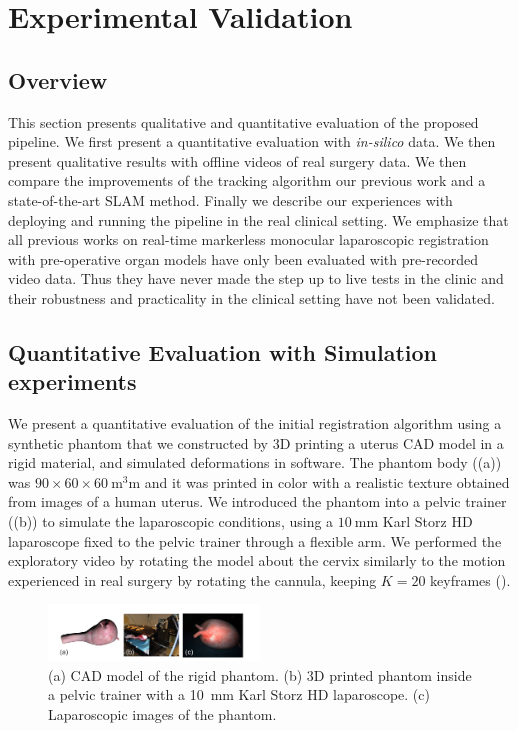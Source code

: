 
\section{Experimental Validation}
\label{sec:experiments}
\subsection{Overview}
This section presents qualitative and quantitative evaluation of the proposed pipeline. We first present a quantitative evaluation with \textit{in-silico} data. We then present qualitative results with offline videos of real surgery data. We then compare the improvements of the tracking algorithm \wrt our previous work and a state-of-the-art SLAM method. Finally we describe our experiences with deploying and running the pipeline in the real clinical setting. We emphasize that all previous works on real-time markerless monocular laparoscopic registration with pre-operative organ models have only been evaluated with pre-recorded video data. Thus they have never made the step up to live tests in the clinic and their robustness and practicality in the clinical setting have not been validated. 

\subsection{Quantitative Evaluation with Simulation experiments}
\label{sec:experiments_Simulation}
We present a quantitative evaluation of the initial registration algorithm using a synthetic phantom that we constructed by 3D printing a uterus CAD model in a rigid material, and simulated deformations in software.
The phantom body ((a)) was $90 \times 60 \times 60~\si{\cubic\milli\metre}$ and it was printed in color with a realistic texture obtained from images of a human uterus. We introduced the phantom into a pelvic trainer ((b)) to simulate the laparoscopic conditions, using a $\SI{10}{\milli\metre}$ Karl Storz HD laparoscope fixed to the pelvic trainer through a flexible arm. We performed the exploratory video by rotating the model about the cervix similarly to the motion experienced in real surgery by rotating the cannula, keeping $K=20$ keyframes ().
 
\begin{figure}[htb]
  \centering
  \includegraphics[width=0.5\textwidth]{./figs/phantom.pdf}
\caption{(a) CAD model of the rigid phantom. (b) 3D printed phantom inside a pelvic trainer with a \SI{10}{\milli\metre} Karl Storz HD laparoscope. (c) Laparoscopic images of the phantom.}
\label{fig:phantom}
\end{figure}


